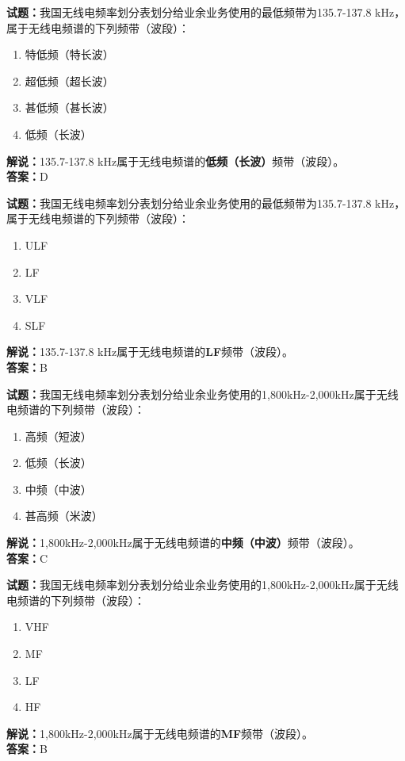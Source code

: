 \documentclass{ctexbook}
\begin{document}
\bigskip


\noindent\textbf{试题：}我国无线电频率划分表划分给业余业务使用的最低频带为135.7-137.8 \unit{\kHz}，属于无线电频谱的下列频带（波段）：
\begin{enumerate}[leftmargin=3em]
\item 特低频（特长波）
\item 超低频（超长波）
\item 甚低频（甚长波）
\item 低频（长波）
\end{enumerate}
\noindent\textbf{解说：}135.7-137.8 \unit{\kHz}属于无线电频谱的\textbf{低频（长波）}频带（波段）。\\\noindent\textbf{答案：}D



\bigskip


\noindent\textbf{试题：}我国无线电频率划分表划分给业余业务使用的最低频带为135.7-137.8 \unit{\kHz}，属于无线电频谱的下列频带（波段）：
\begin{enumerate}[leftmargin=3em]
\item ULF
\item LF
\item VLF
\item SLF
\end{enumerate}
\noindent\textbf{解说：}135.7-137.8 \unit{\kHz}属于无线电频谱的\textbf{LF}频带（波段）。\\\noindent\textbf{答案：}B




\bigskip


\noindent\textbf{试题：}我国无线电频率划分表划分给业余业务使用的1,800\unit{\kHz}-2,000\unit{\kHz}属于无线电频谱的下列频带（波段）：
\begin{enumerate}[leftmargin=3em]
\item 高频（短波）
\item 低频（长波）
\item 中频（中波）
\item 甚高频（米波）
\end{enumerate}
\noindent\textbf{解说：}1,800\unit{\kHz}-2,000\unit{\kHz}属于无线电频谱的\textbf{中频（中波）}频带（波段）。\\\noindent\textbf{答案：}C




\bigskip


\noindent\textbf{试题：}我国无线电频率划分表划分给业余业务使用的1,800\unit{\kHz}-2,000\unit{\kHz}属于无线电频谱的下列频带（波段）：
\begin{enumerate}[leftmargin=3em]
\item VHF
\item MF
\item LF
\item HF
\end{enumerate}
\noindent\textbf{解说：}1,800\unit{\kHz}-2,000\unit{\kHz}属于无线电频谱的\textbf{MF}频带（波段）。\\\noindent\textbf{答案：}B
\end{document}
